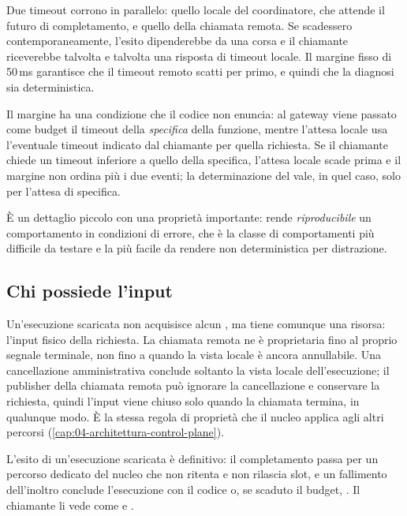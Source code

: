 Due timeout corrono in parallelo: quello locale del coordinatore, che attende il
futuro di completamento, e quello della chiamata remota. Se scadessero
contemporaneamente, l'esito dipenderebbe da una corsa e il chiamante riceverebbe
talvolta  e talvolta una risposta di timeout locale. Il margine fisso
di 50\,ms garantisce che il timeout remoto scatti per primo, e quindi che la
diagnosi sia deterministica.

Il margine ha una condizione che il codice non enuncia: al gateway viene passato
come budget il timeout della \emph{specifica} della funzione, mentre l'attesa
locale usa l'eventuale timeout indicato dal chiamante per quella richiesta. Se il
chiamante chiede un timeout inferiore a quello della specifica, l'attesa locale
scade prima e il margine non ordina pi\`u i due eventi; la determinazione del
 vale, in quel caso, solo per l'attesa di specifica.
\begin{damisurare}
\end{damisurare}

\`E un dettaglio piccolo con una propriet\`a importante: rende \emph{riproducibile}
un comportamento in condizioni di errore, che \`e la classe di comportamenti pi\`u
difficile da testare e la pi\`u facile da rendere non deterministica per
distrazione.

\subsection{Chi possiede l'input}

Un'esecuzione scaricata non acquisisce alcun , ma tiene comunque
una risorsa: l'input fisico della richiesta. La chiamata remota ne \`e proprietaria
fino al proprio segnale terminale, non fino a quando la vista locale \`e ancora
annullabile. Una cancellazione amministrativa conclude soltanto la vista locale
dell'esecuzione; il publisher della chiamata remota pu\`o ignorare la cancellazione
e conservare la richiesta, quindi l'input viene chiuso solo quando la chiamata
termina, in qualunque modo. \`E la stessa regola di propriet\`a che il nucleo applica
agli altri percorsi (\cref{cap:04-architettura-control-plane}).

L'esito di un'esecuzione scaricata \`e definitivo: il completamento passa per un
percorso dedicato del nucleo che non ritenta e non rilascia slot, e un fallimento
dell'inoltro conclude l'esecuzione con il codice  o, se
scaduto il budget, . Il chiamante li vede come  e
.

